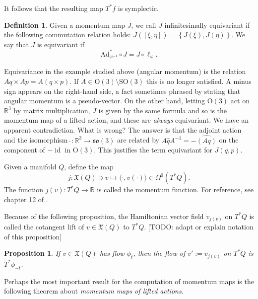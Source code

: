 \documentclass[a5paper,10pt,twoside]{article}
\newcommand{\R}{\ensuremath{\mathbb{R}}}
\DeclareMathOperator*{\id}{id}
\theoremstyle{plain}
\newtheorem{prop}[teo]{Proposition}
\theoremstyle{definition}
\newtheorem{defn}[teo]{Definition}
\theoremstyle{remark}
\begin{document}
It follows that the resulting map $T^*f$ is symplectic.

\begin{defn}
Given a momentum map $J$, we call $J$ infinitesimally equivariant if the following commutation relation holds: $J([\xi,\eta])=\left\{J(\xi),J(\eta)\right\}$.  We say that $J$ is equivariant if
\[
\mathrm{Ad}_{\varphi^{-1}}^*\circ J = J\circ \ell_\varphi.
\]
\end{defn}

Equivariance in the example studied above (angular momentum) is the relation $Aq\times Ap=A(q\times p)$. If $A\in \mathrm{O}(3)\setminus\mathrm{SO}(3)$ this is no longer satisfied. A minus sign appears on the right-hand side, a fact sometimes phrased by stating that angular momentum is a pseudo-vector. On the other hand, letting $\mathrm{O}(3)$ act on $\R^3$ by matrix multiplication, $J$ is given by the same formula and so is the momentum map of a lifted action, and these are \textit{always} equivariant. We have an apparent contradiction. What is wrong? The answer is that the adjoint action and the isomorphism $\hat{\ }:\R^3\to\mathfrak{so}(3)$ are related by $A\hat{q}A^{-1}=-\hat{(Aq)}$ on the component of $-\id$ in O$(3)$. This justifies the term equivariant for $J(q,p)$.
 
Given a manifold $Q$, define the map
%
\begin{equation}
 j:\mathfrak{X}(Q)\ni v\mapsto \langle \cdot,v(\cdot)\rangle \in \Omega^0(T^*Q).
\end{equation}
%
The function $j(v):T^*Q\to\R$ is called the momentum function. For reference, see chapter 12 of \cite{marsden1999mechanics}.

Because of the following proposition, the Hamiltonian vector field $v_{j(v)}$ on $T^*Q$ is called the cotangent lift of $v\in\mathfrak{X}(Q)$ to $T^*Q$. [TODO: adapt or explain notation of this proposition]

\begin{prop}\label{prop:lifted-flow}
If $v\in\mathfrak{X}(Q)$ has flow $\phi_t$, then the flow of $v':=v_{j(v)}$  on $T^*Q$ is $T^*\phi_{-t}$.
\end{prop}

Perhaps the most important result for the computation of momentum maps is the following theorem about \textit{momentum maps of lifted actions}.
\end{document}

